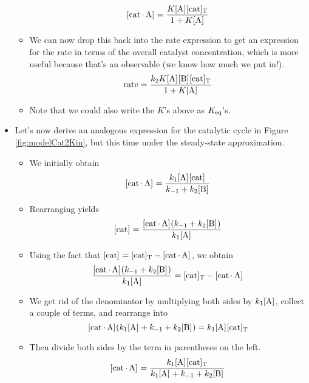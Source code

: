 \documentclass[../notes.tex]{subfiles}
\begin{document}
\begin{itemize}
\begin{itemize}
        \begin{equation*}
            \cnc{cat*A} = \frac{K\cnc{A}\cnc[T]{cat}}{1+K\cnc{A}}
        \end{equation*}
        \item We can now drop this back into the rate expression to get an expression for the rate in terms of the overall catalyst concentration, which is more useful because that's an observable (we know how much we put in!).
        \begin{equation*}
            \rate = \frac{k_2K\cnc{A}\cnc{B}\cnc[T]{cat}}{1+K\cnc{A}}
        \end{equation*}
        \item Note that we could also write the $K$'s above as $K_\textup{eq}$'s.
    \end{itemize}
    \item Let's now derive an analogous expression for the catalytic cycle in Figure \ref{fig:modelCat2Kin}, but this time under the steady-state approximation.
    \begin{itemize}
        \item We initially obtain
        \begin{equation*}
            \cnc{cat*A} = \frac{k_1\cnc{A}\cnc{cat}}{k_{-1}+k_2\cnc{B}}
        \end{equation*}
        \item Rearranging yields
        \begin{equation*}
            \cnc{cat} = \frac{\cnc{cat*A}(k_{-1}+k_2\cnc{B})}{k_1\cnc{A}}
        \end{equation*}
        \item Using the fact that $\cnc{cat}=\cnc[T]{cat}-\cnc{cat*A}$, we obtain
        \begin{equation*}
            \frac{\cnc{cat*A}(k_{-1}+k_2\cnc{B})}{k_1\cnc{A}} = \cnc[T]{cat}-\cnc{cat*A}
        \end{equation*}
        \item We get rid of the denominator by multiplying both sides by $k_1\cnc{A}$, collect a couple of terms, and rearrange into
        \begin{equation*}
            \cnc{cat*A}(k_1\cnc{A}+k_{-1}+k_2\cnc{B}) = k_1\cnc{A}\cnc[T]{cat}
        \end{equation*}
        \item Then divide both sides by the term in parentheses on the left.
        \begin{equation*}
            \cnc{cat*A} = \frac{k_1\cnc{A}\cnc[T]{cat}}{k_1\cnc{A}+k_{-1}+k_2\cnc{B}}

\end{equation*}
\end{itemize}
\end{itemize}
\end{document}
